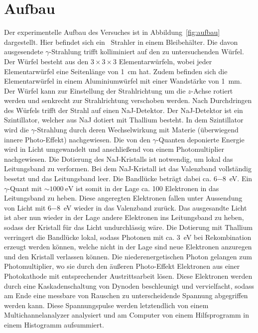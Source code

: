 

\section{Aufbau}

Der experimentelle Aufbau des Versuches ist in Abbildung~\ref{fig:aufbau}
dargestellt. Hier befindet sich ein \Cs~Strahler in einem Bleibehälter.
Die davon ausgesendete $\gamma$-Strahlung trifft kolliminiert auf den zu
untersuchenden Würfel. Der Würfel besteht aus den $3\times 3 \times 3$
Elementarwürfeln, wobei jeder Elementarwürfel eine Seitenlänge von \SI{1}{\cm}
hat. Zudem befinden sich die Elementarwürfel in einem Aluminiumwürfel mit einer
Wandstärke von \SI{1}{\mm}. Der Würfel kann zur Einstellung der Strahlrichtung
um die $z$-Achse rotiert werden und senkrecht zur Strahlrichtung verschoben
werden. Nach Durchdringen des Würfels trifft der Strahl auf einen NaJ-Detektor.
Der NaJ-Detektor ist ein Szintillator, welcher aus NaJ dotiert mit
Thallium besteht. In dem Szintillator wird die
$\gamma$-Strahlung durch deren Wechselwirkung mit Materie
(überwiegend innere Photo-Effekt) nachgewiesen.\cite{kern_und_teilchenphysik}
Die von den $\gamma$-Quanten deponierte Energie wird in
Licht umgewandelt und anschließend von einem Photomultiplier nachgewiesen.
Die Dotierung des NaJ-Kristalls ist notwendig, um lokal das Leitungsband zu
verformen. Bei dem NaJ-Kristall ist das Valenzband vollständig besetzt und das
Leitungsband leer. Die Bandlücke beträgt dabei ca. \SI{6-8}{\eV}.
Ein $\gamma$-Quant mit $\sim \SI{1000}{\eV}$ ist somit in der Lage ca. 100
Elektronen in das Leitungsband zu heben. Diese angeregten Elektronen fallen
unter Aussendung von Licht mit \SI{6-8}{\eV} wieder in das Valenzband zurück.
Das ausgesandte Licht ist aber nun wieder in der Lage andere Elektronen ins
Leitungsband zu heben, sodass der Kristall für das Licht undurchlässig wäre.
Die Dotierung mit Thallium verringert die Bandlücke lokal, sodass Photonen mit
ca. \SI{3}{\eV} bei Rekombination erzeugt werden können, welche nicht in der
Lage sind neue Elektronen anzuregen und den Kristall verlassen können.
Die niederenergetischen Photon gelangen zum Photomultiplier, wo sie durch den
äußeren Photo-Effekt Elektronen aus einer Photokathode mit entsprechender
Austrittsarbeit lösen. Diese Elektronen werden durch eine Kaskadenschaltung von
Dynoden beschleunigt und vervielfacht, sodass am Ende eine messbare von
Rauschen zu unterscheidende Spannung abgegriffen werden kann.
Diese Spannungspulse werden letztendlich von einem Multichannelanalyzer
analysiert und am Computer von einem Hilfsprogramm in einem Histogramm
aufsummiert.

